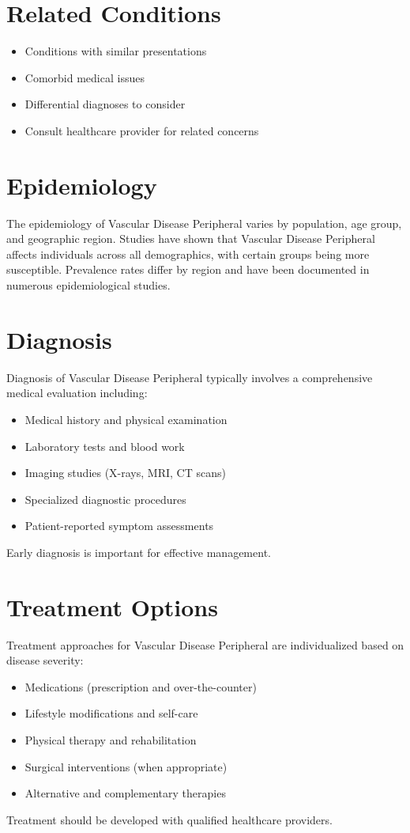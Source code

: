 \section*{Related Conditions}
\begin{itemize}
  \item Conditions with similar presentations
  \item Comorbid medical issues
  \item Differential diagnoses to consider
  \item Consult healthcare provider for related concerns
\end{itemize}

\section*{Epidemiology}
The epidemiology of Vascular Disease Peripheral varies by population, age group, and geographic region. Studies have shown that Vascular Disease Peripheral affects individuals across all demographics, with certain groups being more susceptible. Prevalence rates differ by region and have been documented in numerous epidemiological studies.

\section*{Diagnosis}
Diagnosis of Vascular Disease Peripheral typically involves a comprehensive medical evaluation including:
\begin{itemize}
  \item Medical history and physical examination
  \item Laboratory tests and blood work
  \item Imaging studies (X-rays, MRI, CT scans)
  \item Specialized diagnostic procedures
  \item Patient-reported symptom assessments
\end{itemize}
Early diagnosis is important for effective management.

\section*{Treatment Options}
Treatment approaches for Vascular Disease Peripheral are individualized based on disease severity:
\begin{itemize}
  \item Medications (prescription and over-the-counter)
  \item Lifestyle modifications and self-care
  \item Physical therapy and rehabilitation
  \item Surgical interventions (when appropriate)
  \item Alternative and complementary therapies
\end{itemize}
Treatment should be developed with qualified healthcare providers.

